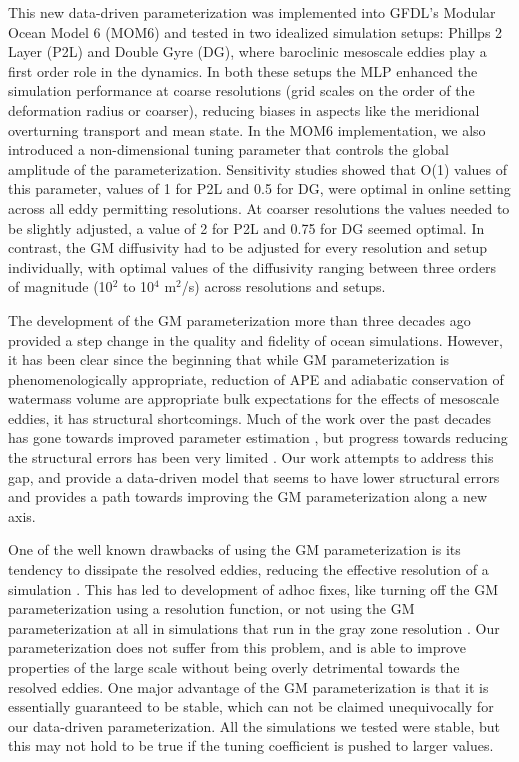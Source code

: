 \documentclass[draft]{agujournal2019}
\begin{document}
This new data-driven parameterization was implemented into GFDL's Modular Ocean Model 6 (MOM6) and tested in two idealized simulation setups: Phillps 2 Layer (P2L) and Double Gyre (DG), where baroclinic mesoscale eddies play a first order role in the dynamics. In both these setups the MLP enhanced the simulation performance at coarse resolutions (grid scales on the order of the deformation radius or coarser), reducing biases in aspects like the meridional overturning transport and mean state. In the MOM6 implementation, we also introduced a non-dimensional tuning parameter that controls the global amplitude of the parameterization. Sensitivity studies showed that O(1) values of this parameter, values of 1 for P2L and 0.5 for DG, were optimal in online setting across all eddy permitting resolutions. At coarser resolutions the values needed to be slightly adjusted, a value of 2 for P2L and 0.75 for DG seemed optimal. In contrast, the GM diffusivity had to be adjusted for every resolution and setup individually, with optimal values of the diffusivity ranging between three orders of magnitude (10$^2$ to 10$^4$ m$^2$/s) across resolutions and setups.

The development of the GM parameterization more than three decades ago provided a step change in the quality and fidelity of ocean simulations. However, it has been clear since the beginning that while GM parameterization is phenomenologically appropriate, reduction of APE and adiabatic conservation of watermass volume are appropriate bulk expectations for the effects of mesoscale eddies, it has structural shortcomings. Much of the work over the past decades has gone towards improved parameter estimation \cite{visbeck1997specification}, but progress towards reducing the structural errors has been very limited \cite{smith2004anisotropic}. Our work attempts to address this gap, and provide a data-driven model that seems to have lower structural errors and provides a path towards improving the GM parameterization along a new axis. 

One of the well known drawbacks of using the GM parameterization is its tendency to dissipate the resolved eddies, reducing the effective resolution of a simulation \cite{hallberg2013using}. This has led to development of adhoc fixes, like turning off the GM parameterization using a resolution function, or not using the GM parameterization at all in simulations that run in the gray zone resolution \cite{adcroft2019gfdl}. Our parameterization does not suffer from this problem, and is able to improve properties of the large scale without being overly detrimental towards the resolved eddies. One major advantage of the GM parameterization is that it is essentially guaranteed to be stable, which can not be claimed unequivocally for our data-driven parameterization. All the simulations we tested were stable, but this may not hold to be true if the tuning coefficient is pushed to larger values. 
\end{document}
